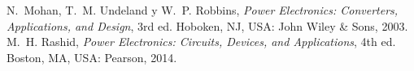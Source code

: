 \documentclass[conference]{IEEEtran}
\begin{document}
\begin{thebibliography}{plain}
N.~Mohan, T.~M. Undeland y W.~P. Robbins,
\textit{Power Electronics: Converters, Applications, and Design},
3rd ed. Hoboken, NJ, USA: John Wiley \& Sons, 2003.
M.~H. Rashid, \textit{Power Electronics: Circuits, Devices, and Applications},
4th ed. Boston, MA, USA: Pearson, 2014.

\end{thebibliography}
\end{document}
